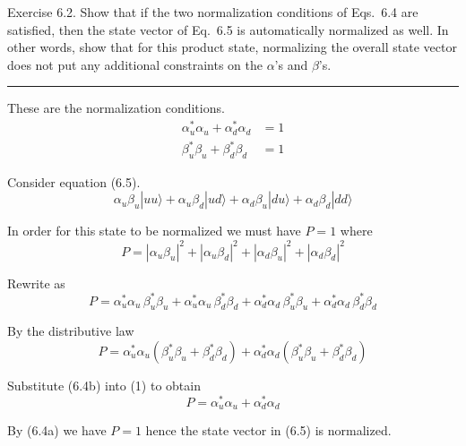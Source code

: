 \documentclass[12pt]{article}
\begin{document}
Exercise 6.2.
Show that if the two normalization conditions
of Eqs.~6.4 are satisfied, then the state vector of Eq.~6.5 is
automatically normalized as well.
In other words, show that for this product state, normalizing
the overall state vector does not put any additional constraints
on the $\alpha$'s and $\beta$'s.

\bigskip
\hrule

\bigskip
These are the normalization conditions.
\begin{align*}
\alpha_u^*\alpha_u+\alpha_d^*\alpha_d&=1\tag{6.4a}
\\[1ex]
\beta_u^*\beta_u+\beta_d^*\beta_d&=1\tag{6.4b}
\end{align*}

Consider equation (6.5).
\begin{equation*}
\alpha_u\beta_u|uu\rangle
+\alpha_u\beta_d|ud\rangle
+\alpha_d\beta_u|du\rangle
+\alpha_d\beta_d|dd\rangle
\tag{6.5}
\end{equation*}

In order for this state to be normalized we must have $P=1$ where
\begin{equation*}
P=|\alpha_u\beta_u|^2+|\alpha_u\beta_d|^2+|\alpha_d\beta_u|^2+|\alpha_d\beta_d|^2
\end{equation*}

Rewrite as
\begin{equation*}
P
=\alpha_u^*\alpha_u\,\beta_u^*\beta_u
+\alpha_u^*\alpha_u\,\beta_d^*\beta_d
+\alpha_d^*\alpha_d\,\beta_u^*\beta_u
+\alpha_d^*\alpha_d\,\beta_d^*\beta_d
\end{equation*}

By the distributive law
\begin{equation*}
P
=\alpha_u^*\alpha_u(\beta_u^*\beta_u+\beta_d^*\beta_d)
+\alpha_d^*\alpha_d(\beta_u^*\beta_u+\beta_d^*\beta_d)
\tag{1}
\end{equation*}

Substitute (6.4b) into (1) to obtain
\begin{equation*}
P=\alpha_u^*\alpha_u+\alpha_d^*\alpha_d
\end{equation*}

By (6.4a) we have $P=1$ hence the state vector in (6.5) is normalized.
\end{document}
